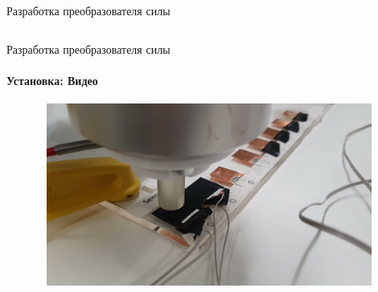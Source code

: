 \documentclass[aspectratio=169,xcolor=table]{beamer}
\begin{document}
\begin{frame}[t]{Разработка преобразователя силы}
\begin{columns}[T,onlytextwidth]
\begin{column}{0.39\textwidth}
        \end{column}
    \end{columns}
\end{frame}

\begin{frame}[t]{Разработка преобразователя силы}
    \framesubtitle{Установка: Видео}
    \vspace{-15pt}
    \begin{figure}[H]
        \href{run:./videos/exp_stand_video.mp4}{
            \centering\includegraphics[height=6cm,width=1\textwidth,keepaspectratio]{exp_stand_video_preview.jpg}}
    \end{figure}
\end{frame}
\end{document}
